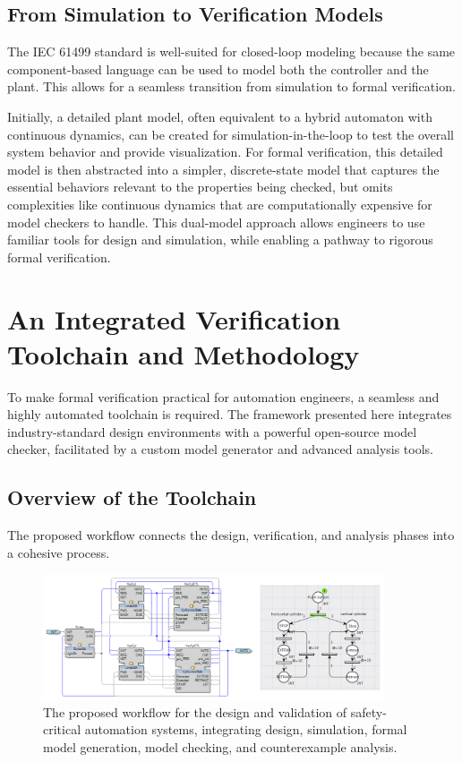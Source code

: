 \subsection{From Simulation to Verification Models}

The IEC 61499 standard is well-suited for closed-loop modeling because the same component-based language can be used to model both the controller and the plant. This allows for a seamless transition from simulation to formal verification.

Initially, a detailed plant model, often equivalent to a hybrid automaton with continuous dynamics, can be created for simulation-in-the-loop to test the overall system behavior and provide visualization. For formal verification, this detailed model is then abstracted into a simpler, discrete-state model that captures the essential behaviors relevant to the properties being checked, but omits complexities like continuous dynamics that are computationally expensive for model checkers to handle. This dual-model approach allows engineers to use familiar tools for design and simulation, while enabling a pathway to rigorous formal verification.

\section{An Integrated Verification Toolchain and Methodology}\label{sec:toolchain}

To make formal verification practical for automation engineers, a seamless and highly automated toolchain is required. The framework presented here integrates industry-standard design environments with a powerful open-source model checker, facilitated by a custom model generator and advanced analysis tools.

\subsection{Overview of the Toolchain}

The proposed workflow connects the design, verification, and analysis phases into a cohesive process.

\begin{figure}[h]
\centering
\includegraphics[width=0.9\textwidth]{MX_Papers/Paper3/pic/system_functional_model.png}
\caption{The proposed workflow for the design and validation of safety-critical automation systems, integrating design, simulation, formal model generation, model checking, and counterexample analysis.}
\label{fig:workflow}
\end{figure}

